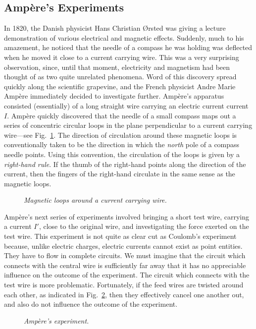 \subsection{Amp\`{e}re's Experiments}\label{s8.2}
In 1820, the Danish physicist Hans Christian \O rsted was giving a lecture 
demonstration of various electrical and
magnetic effects. Suddenly, much to his amazement, he noticed that
the needle of a compass he was holding
was deflected  when he moved it close to  a current carrying
wire. This was a very surprising observation, since, until that moment, electricity and
magnetism had been thought of  as two quite  unrelated phenomena.
Word of this discovery spread quickly along the scientific grapevine,
and the French physicist  Andre Marie Amp\`{e}re 
immediately decided to investigate further. 
Amp\`{e}re's apparatus consisted (essentially) of a long straight wire carrying an
electric current
current $I$. Amp\`{e}re quickly discovered that the needle of a small compass maps
out a series of concentric circular loops in the plane
perpendicular to  a current carrying wire---see Fig.~\ref{f8.1}.
The direction of circulation around these magnetic loops is conventionally taken to be
the direction in which the {\em north}\/ pole of a compass needle
points.
Using  this convention, the circulation of the loops is given by a
{\em right-hand rule}. If the thumb of the right-hand points along the direction of the
current, then the fingers of the right-hand circulate in the same sense as the 
magnetic loops.

\begin{figure}[h]
\epsfysize=2.5in
\centerline{}
\caption{\em Magnetic loops around a current carrying wire.}\label{f8.1}
\end{figure}

Amp\`{e}re's next series of experiments involved bringing a short test wire, carrying
a current $I'$,
close to the original wire, and investigating the force exerted on the test wire.
This experiment is not quite as clear cut as Coulomb's experiment because, unlike
electric charges, 
electric currents cannot exist as point entities. They
have to flow in complete circuits. We must
imagine that the circuit which connects with  the central wire is sufficiently
far away that it has no appreciable influence on the outcome of the experiment.
The circuit which connects with
 the test wire is more problematic. Fortunately, if the
feed wires are twisted around each other, as indicated in Fig.~\ref{f8.2}, then 
they effectively cancel one another out, and also do not influence the outcome of
the experiment.
\begin{figure}[h]
\epsfysize=2.5in
\centerline{}
\caption{\em Amp\`{e}re's experiment.}\label{f8.2}
\end{figure}

